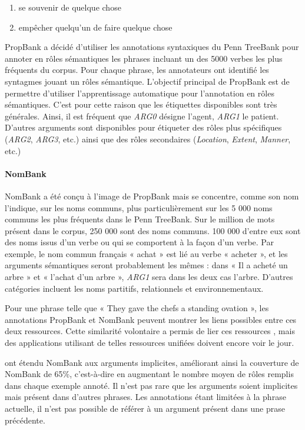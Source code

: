 \begin{enumerate}
    \item se souvenir de quelque chose
    \item empêcher quelqu'un de faire quelque chose
\end{enumerate}

PropBank \citep{palmer2005proposition} a décidé d'utiliser les annotations
syntaxiques du Penn TreeBank \citep{marcus1993building} pour annoter en rôles
sémantiques les phrases incluant un des 5000 verbes les plus fréquents du
corpus. Pour chaque phrase, les annotateurs ont identifié les syntagmes jouant
un rôles sémantique. L'objectif principal de PropBank est de permettre
d'utiliser l'apprentissage automatique pour l'annotation en rôles sémantiques.
C'est pour cette raison que les étiquettes disponibles sont très générales.
Ainsi, il est fréquent que \textit{ARG0} désigne l'agent, \textit{ARG1} le
patient. D'autres arguments sont disponibles pour étiqueter des rôles plus
spécifiques (\textit{ARG2}, \textit{ARG3}, etc.) ainsi que des rôles
secondaires (\textit{Location}, \textit{Extent}, \textit{Manner}, etc.)

\paragraph{NomBank}

NomBank \citep{meyers2004nombank} a été conçu à l'image de PropBank mais se
concentre, comme son nom l'indique, sur les noms communs, plus particulièrement
sur les 5 000 noms communs les plus fréquents dans le Penn TreeBank. Sur le
million de mots présent dans le corpus, 250 000 sont des noms communs. 100 000
d'entre eux sont des noms issus d'un verbe ou qui se comportent à la façon d'un
verbe. Par exemple, le nom commun français « achat » est lié au verbe « acheter
», et les arguments sémantiques seront probablement les mêmes : dans « Il a
acheté un arbre » et « l'achat d'un arbre », \textit{ARG1} sera dans les deux
cas l'arbre. D'autres catégories incluent les noms partitifs, relationnels et
environnementaux.

Pour une phrase telle que « They gave the chefs a standing ovation », les
annotations PropBank et NomBank peuvent montrer les liens possibles entre ces
deux ressources. Cette similarité volontaire a permis de lier ces ressources
\citep{pustejovsky2005merging,verhagen2007combining}, mais des applications
utilisant de telles ressources unifiées doivent encore voir le jour.

\cite{gerber2010beyond} ont étendu NomBank aux arguments
implicites, améliorant ainsi la couverture de NomBank de 65\%, c'est-à-dire en
augmentant le nombre moyen de rôles remplis dans chaque exemple annoté. Il
n'est pas rare que les arguments soient implicites mais présent dans d'autres
phrases. Les annotations étant limitées à la phrase actuelle, il n'est pas
possible de référer à un argument présent dans une prase précédente.

